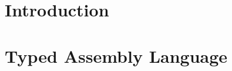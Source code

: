 




\begin{titlepage}
\maketitle
\end{titlepage}
\tableofcontents

\chapter{Introduction}




\chapter{Typed Assembly Language}


% 
% 
% 
% 
% 
% 
% 

% 
% 
% 
% 
% 
% 

\listoftodos[Notes]


